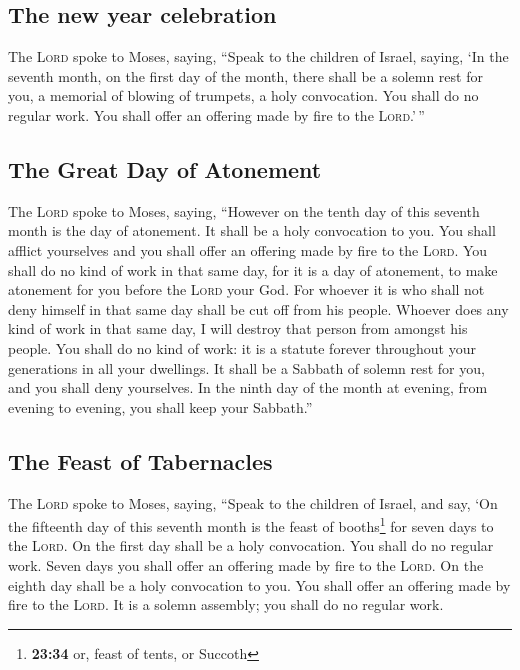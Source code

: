 \hypertarget{the-new-year-celebration}{%
\subsection{The new year celebration}\label{the-new-year-celebration}}

 The \textsc{Lord} spoke to Moses, saying,
 ``Speak to the children of Israel, saying, `In the
seventh month, on the first day of the month, there shall be a solemn
rest for you, a memorial of blowing of trumpets, a holy convocation.
 You shall do no regular work. You shall offer an
offering made by fire to the \textsc{Lord}.'\,''

\hypertarget{the-great-day-of-atonement}{%
\subsection{The Great Day of
Atonement}\label{the-great-day-of-atonement}}

 The \textsc{Lord} spoke to Moses, saying,
 ``However on the tenth day of this seventh month is the
day of atonement. It shall be a holy convocation to you. You shall
afflict yourselves and you shall offer an offering made by fire to the
\textsc{Lord}.  You shall do no kind of work in that same
day, for it is a day of atonement, to make atonement for you before the
\textsc{Lord} your God.  For whoever it is who shall not
deny himself in that same day shall be cut off from his people.
 Whoever does any kind of work in that same day, I will
destroy that person from amongst his people.  You shall
do no kind of work: it is a statute forever throughout your generations
in all your dwellings.  It shall be a Sabbath of solemn
rest for you, and you shall deny yourselves. In the ninth day of the
month at evening, from evening to evening, you shall keep your
Sabbath.''

\hypertarget{the-feast-of-tabernacles}{%
\subsection{The Feast of Tabernacles}\label{the-feast-of-tabernacles}}

 The \textsc{Lord} spoke to Moses, saying,
 ``Speak to the children of Israel, and say, `On the
fifteenth day of this seventh month is the feast of booths\footnote{\textbf{23:34}
  or, feast of tents, or Succoth} for seven days to the \textsc{Lord}.
 On the first day shall be a holy convocation. You shall
do no regular work.  Seven days you shall offer an
offering made by fire to the \textsc{Lord}. On the eighth day shall be a
holy convocation to you. You shall offer an offering made by fire to the
\textsc{Lord}. It is a solemn assembly; you shall do no regular work.

